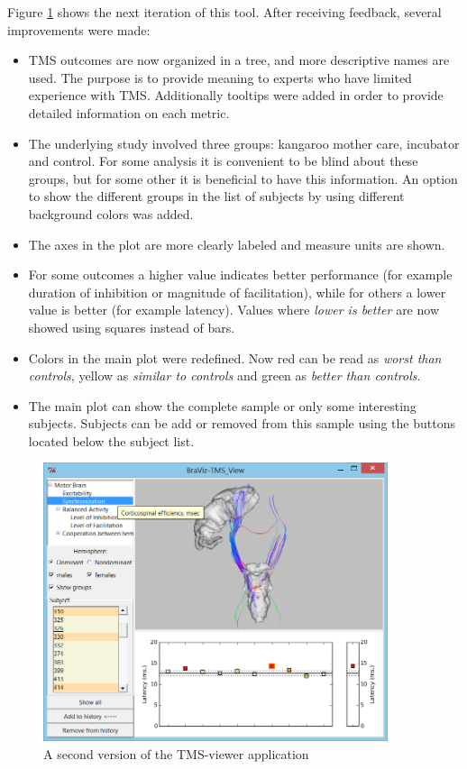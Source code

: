 Figure \ref{fig_tms_view_second} shows the next iteration of this tool. After receiving feedback, several improvements were made:
\begin{itemize}
	\item TMS outcomes are now organized in a tree, and more descriptive names are used. The purpose is to provide meaning to experts who have limited experience with TMS. Additionally tooltips were added in order to provide detailed information on each metric.
	\item The underlying study involved three groups: kangaroo mother care, incubator and control. For some analysis it is convenient to be blind about these groups, but for some other it is beneficial to have this information. An option to show the different groups in the list of subjects by using different background colors was added.
	\item The axes in the plot are more clearly labeled and measure units are shown. 
	\item For some outcomes a higher value indicates better performance (for example duration of inhibition or magnitude of facilitation), while for others a lower value is better (for example latency). Values where \emph{lower is better} are now showed using squares instead of bars.
	\item Colors in the main plot were redefined. Now red can be read as \emph{worst than controls}, yellow as \emph{similar to controls} and green as \emph{better than controls}.
	\item The main plot can show the complete sample or only some interesting subjects. Subjects can be add or removed from this sample using the buttons located below the subject list.
\end{itemize}

\begin{figure}
	\centering
		\includegraphics[width=0.90\textwidth]{figures/analysis/tms_view_motor}
	\caption{A second version of the TMS-viewer application}
	\label{fig_tms_view_second}
\end{figure}

